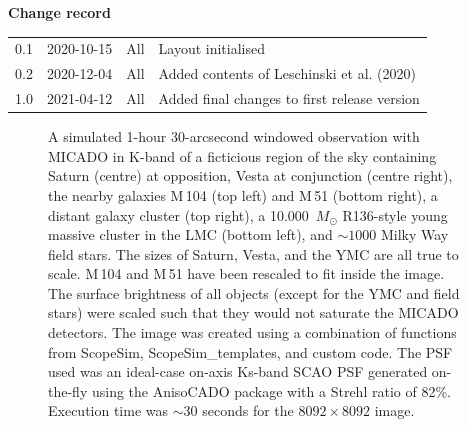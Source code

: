 \documentclass[a4paper,twoside,11pt]{article}
\begin{document}



\dmdmaketitle



\begin{center}
  \textbf{Change record}

  \tabletail{\hline}

  \begin{supertabular}{|l|l|l|l|}
   0.1 & 2020-10-15 & All & Layout initialised \\
   0.2 & 2020-12-04 & All & Added contents of Leschinski et al. (2020) \\
   1.0 & 2021-04-12 & All & Added final changes to first release version \\
   \hline
  \end{supertabular}

\end{center}


\begin{figure}

\caption*{A simulated 1-hour 30-arcsecond windowed observation with
  MICADO in K-band of a ficticious region of the sky containing Saturn
  (centre) at opposition, Vesta at conjunction (centre right), the
  nearby galaxies M\,104 (top left) and M\,51 (bottom right), a
  distant galaxy cluster (top right), a 10.000~$M_{\odot}$ R136-style
  young massive cluster in the LMC (bottom left), and $\sim 1000$
  Milky Way field stars.  The sizes of Saturn, Vesta, and the YMC are
  all true to scale.  M\,104 and M\,51 have been rescaled to fit
  inside the image.  The surface brightness of all objects (except for
  the YMC and field stars) were scaled such that they would not
  saturate the MICADO detectors.  The image was created using a
  combination of functions from ScopeSim, ScopeSim\_templates, and
  custom code.  The PSF used was an ideal-case on-axis Ks-band SCAO
  PSF generated on-the-fly using the AnisoCADO package with a Strehl
  ratio of 82\%.  Execution time was $\sim 30$ seconds for the
  $8092\times8092$ image.  }
\label{fig-title-page}

\end{figure}
\end{document}
